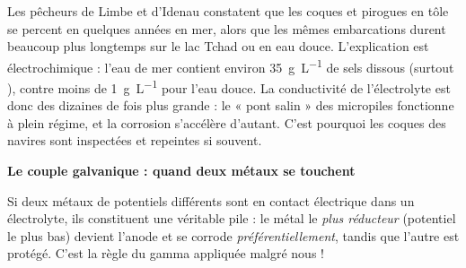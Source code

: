 \documentclass[11pt]{article}
\begin{document}
\begin{exemplebox}
Les pêcheurs de Limbe et d'Idenau constatent que les coques et pirogues en tôle se percent en quelques années en mer, alors que les mêmes embarcations durent beaucoup plus longtemps sur le lac Tchad ou en eau douce. L'explication est électrochimique : l'eau de mer contient environ \SI{35}{g.L^{-1}} de sels dissous (surtout ), contre moins de \SI{1}{g.L^{-1}} pour l'eau douce. La conductivité de l'électrolyte est donc des dizaines de fois plus grande : le « pont salin » des micropiles fonctionne à plein régime, et la corrosion s'accélère d'autant. C'est pourquoi les coques des navires sont inspectées et repeintes si souvent.
\end{exemplebox}

\textbf{Le couple galvanique : quand deux métaux se touchent}\par
Si deux métaux de potentiels différents sont en contact électrique dans un électrolyte, ils constituent une véritable pile : le métal le \emph{plus réducteur} (potentiel le plus bas) devient l'anode et se corrode \emph{préférentiellement}, tandis que l'autre est protégé. C'est la règle du gamma appliquée malgré nous !
\end{document}
